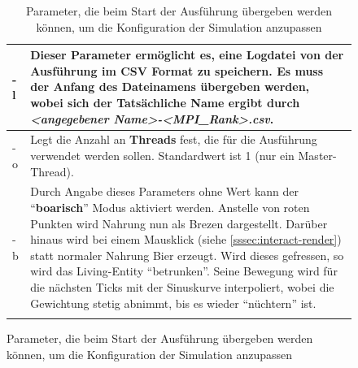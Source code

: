 \documentclass[course=erap]{aspdoc}
\begin{document}
\begin{figure}
\centering
\begin{longtable} {| p{2cm} | p{12cm} |}
\hline
-l & Dieser Parameter ermöglicht es, eine \textbf{Logdatei} von der Ausführung im CSV Format zu speichern.
Es muss der Anfang des Dateinamens übergeben werden, wobei sich der Tatsächliche Name ergibt durch \emph{<angegebener Name>-<MPI\_Rank>.csv}.\\
\hline
-o & Legt die Anzahl an \textbf{Threads} fest, die für die Ausführung verwendet werden sollen. Standardwert ist 1 (nur ein Master-Thread).\\
\hline
-b & Durch Angabe dieses Parameters ohne Wert kann der "`\textbf{boarisch}"' Modus aktiviert werden. Anstelle von roten Punkten wird Nahrung nun als Brezen dargestellt. Darüber hinaus wird bei einem Mausklick (siehe \ref{sssec:interact-render}) statt normaler Nahrung Bier erzeugt. Wird dieses gefressen, so wird das Living-Entity "`betrunken"'. Seine Bewegung wird für die nächsten Ticks mit der Sinuskurve interpoliert, wobei die Gewichtung stetig abnimmt, bis es wieder "`nüchtern"' ist.\\
\hline
\caption{Parameter, die beim Start der Ausführung übergeben werden können, um die Konfiguration der Simulation anzupassen}
\label{table:parameters}
\end{longtable}
\end{figure}
\end{document}
